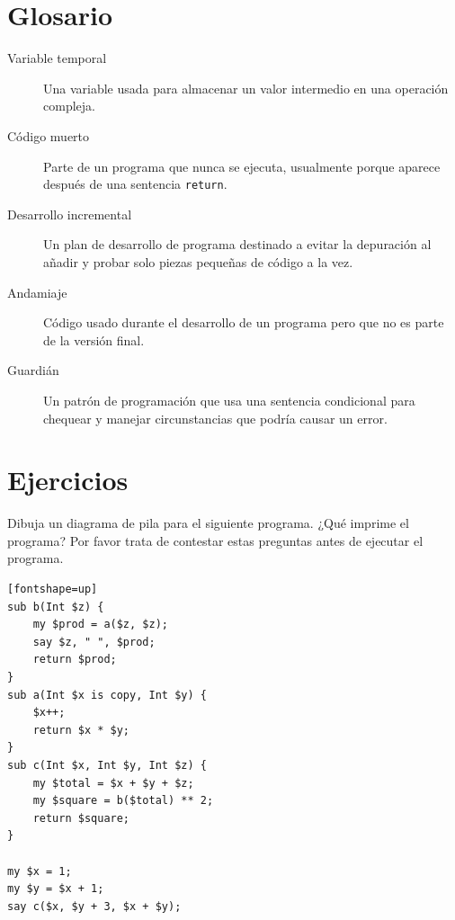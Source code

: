 \section{Glosario}

\begin{description}

\item[Variable temporal]  Una variable usada para almacenar un valor
intermedio en una operación compleja.

\item[Código muerto]  Parte de un programa que nunca se ejecuta, usualmente
porque aparece después de una sentencia {\tt return}.

\item[Desarrollo incremental]  Un plan de desarrollo de programa 
destinado a evitar la depuración al añadir y probar solo piezas
pequeñas de código a la vez.

\item[Andamiaje]  Código usado durante el desarrollo de un programa
pero que no es parte de la versión final.

\item[Guardián]  Un patrón de programación que usa una sentencia
condicional para chequear y manejar circunstancias que podría causar
un error.

\end{description}


\section{Ejercicios}

\begin{exercise}

Dibuja un diagrama de pila para el siguiente programa.
¿Qué imprime el programa? Por favor trata de contestar estas
preguntas antes de ejecutar el programa.

\begin{verbatim}[fontshape=up]
sub b(Int $z) {
    my $prod = a($z, $z);
    say $z, " ", $prod;
    return $prod;
}
sub a(Int $x is copy, Int $y) {
    $x++;
    return $x * $y;
}
sub c(Int $x, Int $y, Int $z) {
    my $total = $x + $y + $z;
    my $square = b($total) ** 2;
    return $square;
}

my $x = 1;
my $y = $x + 1;
say c($x, $y + 3, $x + $y);
\end{verbatim}

\end{exercise}


